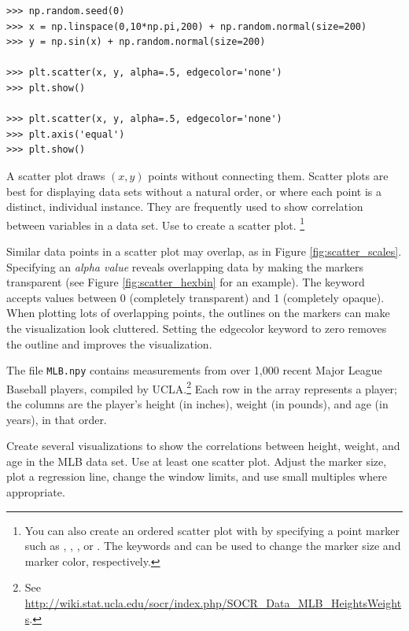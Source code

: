 \begin{lstlisting}
>>> np.random.seed(0)
>>> x = np.linspace(0,10*np.pi,200) + np.random.normal(size=200)
>>> y = np.sin(x) + np.random.normal(size=200)

>>> plt.scatter(x, y, alpha=.5, edgecolor='none')
>>> plt.show()

>>> plt.scatter(x, y, alpha=.5, edgecolor='none')
>>> plt.axis('equal')
>>> plt.show()
\end{lstlisting}

A scatter plot draws $(x,y)$ points without connecting them.
Scatter plots are best for displaying data sets without a natural order, or where each point is a distinct, individual instance.
They are frequently used to show correlation between variables in a data set.
Use  to create a scatter plot.%
\footnote{You can also create an ordered scatter plot with  by specifying a point marker such as , , , or .
The keywords  and  can be used to change the marker size and marker color, respectively.}

Similar data points in a scatter plot may overlap, as in Figure \ref{fig:scatter_scales}.
Specifying an \emph{alpha value} reveals overlapping data by making the markers transparent (see Figure \ref{fig:scatter_hexbin} for an example).
The keyword  accepts values between 0 (completely transparent) and 1 (completely opaque).
When plotting lots of overlapping points, the outlines on the markers can make the visualization look cluttered.
Setting the edgecolor keyword to zero removes the outline and improves the visualization.

\begin{problem} %
The file \texttt{MLB.npy} contains measurements from over 1,000 recent Major League Baseball players, compiled by UCLA.\footnote{See \url{http://wiki.stat.ucla.edu/socr/index.php/SOCR_Data_MLB_HeightsWeights}.}
Each row in the array represents a player; the columns are the player's height (in inches), weight (in pounds), and age (in years), in that order.

Create several visualizations to show the correlations between height, weight, and age in the MLB data set.
Use at least one scatter plot.
Adjust the marker size, plot a regression line, change the window limits, and use small multiples where appropriate.
\end{problem}

